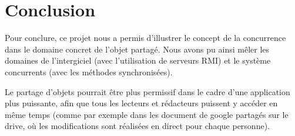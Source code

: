 \documentclass[11pt,a4paper]{report}
\begin{document}
 \section*{Conclusion}
 
 Pour conclure, ce projet nous a permis d'illustrer le concept de la concurrence dans le domaine concret de l'objet partagé. Nous avons pu ainsi mêler les domaines de l'intergiciel (avec l'utilisation de serveurs RMI) et le système concurrents (avec les méthodes synchronisées). 
 
Le partage d'objets pourrait être plus permissif dans le cadre d'une application plus puissante, afin que tous les lecteurs et rédacteurs puissent y accéder en même temps (comme par exemple dans les document de google partagés sur le drive, où les modifications sont réalisées en direct pour chaque personne).   
\end{document}
